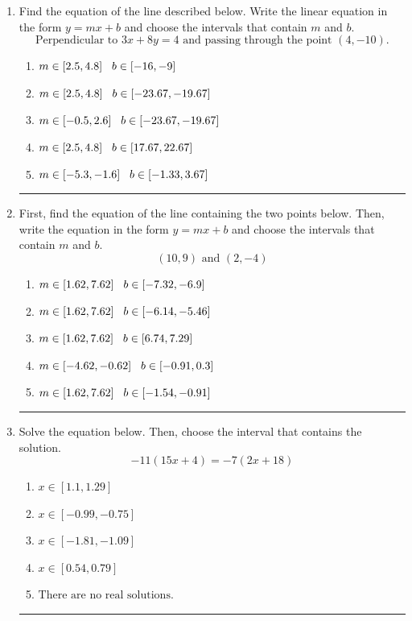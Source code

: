 \documentclass[14pt]{extbook}
\newcommand{\litem}[1]{\item#1\hspace*{-1cm}\rule{\textwidth}{0.4pt}}
\begin{document}
\begin{enumerate}
{\begin{enumerate}[label=\Alph*.]
\end{enumerate} }
\litem{
Find the equation of the line described below. Write the linear equation in the form $ y=mx+b $ and choose the intervals that contain $m$ and $b$.\[ \text{Perpendicular to } 3 x + 8 y = 4 \text{ and passing through the point } (4, -10). \]\begin{enumerate}[label=\Alph*.]
\item \( m \in [2.5, 4.8] \hspace*{3mm} b \in [-16, -9] \)
\item \( m \in [2.5, 4.8] \hspace*{3mm} b \in [-23.67, -19.67] \)
\item \( m \in [-0.5, 2.6] \hspace*{3mm} b \in [-23.67, -19.67] \)
\item \( m \in [2.5, 4.8] \hspace*{3mm} b \in [17.67, 22.67] \)
\item \( m \in [-5.3, -1.6] \hspace*{3mm} b \in [-1.33, 3.67] \)

\end{enumerate} }
\litem{
First, find the equation of the line containing the two points below. Then, write the equation in the form $ y=mx+b $ and choose the intervals that contain $m$ and $b$.\[ (10, 9) \text{ and } (2, -4) \]\begin{enumerate}[label=\Alph*.]
\item \( m \in [1.62, 7.62] \hspace*{3mm} b \in [-7.32, -6.9] \)
\item \( m \in [1.62, 7.62] \hspace*{3mm} b \in [-6.14, -5.46] \)
\item \( m \in [1.62, 7.62] \hspace*{3mm} b \in [6.74, 7.29] \)
\item \( m \in [-4.62, -0.62] \hspace*{3mm} b \in [-0.91, 0.3] \)
\item \( m \in [1.62, 7.62] \hspace*{3mm} b \in [-1.54, -0.91] \)

\end{enumerate} }
\litem{
Solve the equation below. Then, choose the interval that contains the solution.\[ -11(15x + 4) = -7(2x + 18) \]\begin{enumerate}[label=\Alph*.]
\item \( x \in [1.1, 1.29] \)
\item \( x \in [-0.99, -0.75] \)
\item \( x \in [-1.81, -1.09] \)
\item \( x \in [0.54, 0.79] \)
\item \( \text{There are no real solutions.} \)


\end{enumerate}}
\end{enumerate}
\end{document}
